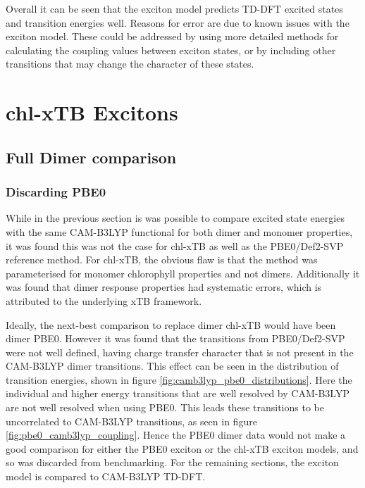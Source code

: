 Overall it can be seen that the exciton model predicts TD-DFT excited states and
transition energies well. Reasons for error are due to known issues with the exciton
model. These could be addressed by using more detailed methods for calculating the
coupling values between exciton states, or by including other transitions that may
change the character of these states.

\afterpartskip
\section{chl-xTB Excitons}
\label{sec:chl_xTB_excitons}

\subsection{Full Dimer comparison}
\label{subsec:pbe0_and_chl_xtb_dimer}

\subsubsection{Discarding PBE0}
\label{subsec:state_assign}

While in the previous section is was possible to compare excited state energies
with the same CAM-B3LYP functional for both dimer and monomer properties, it was
found this was not the case for chl-xTB as well as the PBE0/Def2-SVP reference method.
For chl-xTB, the obvious flaw is that the method was parameterised for monomer chlorophyll
properties and not dimers. Additionally it was found that dimer response properties 
had systematic errors, which is attributed to the underlying xTB framework.

Ideally, the next-best comparison to replace dimer chl-xTB would have been dimer
PBE0. However it was found that the transitions from PBE0/Def2-SVP were not well
defined, having charge transfer character that is not present in the CAM-B3LYP
dimer transitions. This effect can be seen in the distribution of transition energies, 
shown in figure \ref{fig:camb3lyp_pbe0_distributions}. Here the individual \Qy and 
higher energy transitions that are well resolved by CAM-B3LYP are not well resolved
when using PBE0. This leads these transitions to be uncorrelated to CAM-B3LYP transitions,
as seen in figure \ref{fig:pbe0_camb3lyp_coupling}. Hence the PBE0 dimer data would 
not make a good comparison for either the PBE0 exciton or the chl-xTB exciton models, 
and so was discarded from benchmarking. For the remaining sections, the exciton
model is compared to CAM-B3LYP TD-DFT.

